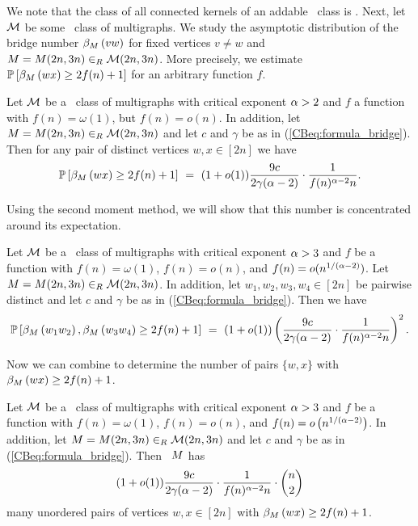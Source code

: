 We note that the class of all connected kernels of an addable \pl\ class is \bridgeStable. Next, let $\mathcal{M}$ be some \bridgeStable\ class of multigraphs. We study the asymptotic distribution of the bridge number $\beta_{M}\left(vw\right)$ for fixed vertices $v\neq w$ and $M=M(2n,3n) \in_R \mathcal{M}(2n,3n)$. More precisely, we estimate $\mathbb{P}\left[\beta_{M}\left(wx\right)\geq 2f(n)+1\right]$ for an arbitrary function $f$. 

\begin{lem}\label{CBlem:bridge_number1}
	Let $\mathcal{M}$ be a \bridgeStable\ class of multigraphs with critical exponent $\alpha>2$ and $f$ a function with $f(n)=\omega(1)$, but $f(n)=o(n)$. In addition, let $M=M(2n,3n)\in_R \mathcal{M}(2n,3n)$ and let $c$ and $\gamma$ be as in (\ref{CBeq:formula_bridge}). Then for any pair of distinct vertices $w, x \in [2n]$ we have 
	\[
	\mathbb{P}\left[\beta_{M}\left(wx\right)\geq 2f(n)+1\right]\ =\ (1+o(1))\frac{9c}{2\gamma (\alpha-2)}\cdot\frac{1}{f(n)^{\alpha-2}n}.
	\]
\end{lem}

Using the second moment method, we will show that this number is concentrated around its expectation. 

\begin{lem}\label{CBlem:bridge_number2}
Let $\mathcal{M}$ be a \bridgeStable\ class of multigraphs with critical exponent $\alpha>3$ and $f$ be a function with $f(n)=\omega(1)$, $f(n)=o(n)$, and $f(n)=o(n^{1/(\alpha-2)})$. Let $M=M(2n,3n)\in_R \mathcal{M}(2n,3n)$. In addition, let $w_1, w_2, w_3, w_4 \in [2n]$ be pairwise distinct and let $c$ and $\gamma$ be as in (\ref{CBeq:formula_bridge}). Then we have 
	\[
	\prob{\Bn{\bridgeGraph}{w_1w_2}, \Bn{\bridgeGraph}{w_3w_4}\geq 2f(n)+1}\ =\ (1+o(1))\left(\frac{9c}{2\gamma (\ce-2)}\cdot\frac{1}{f(n)^{\ce-2}n}\right)^2.
	\]
\end{lem}

Now we can combine  to determine the number of pairs $\{w,x\}$ with $\beta_{M}\left(wx\right)\geq 2f(n)+1$.
\begin{lem}\label{CBlem:bridge_number3}
	Let $\mathcal{M}$ be a \bridgeStable\ class of multigraphs with critical exponent $\alpha>3$ and $f$ be a function with $f(n)=\omega(1)$, $f(n)=o(n)$, and $f(n)=o\left(n^{1/(\alpha-2)}\right)$. In addition, let $M=M(2n,3n)\in_R \mathcal{M}(2n,3n)$ and let $c$ and $\gamma$ be as in (\ref{CBeq:formula_bridge}). Then \whp\ $M$ has
	\begin{align*}
	(1+o(1))\frac{9c}{2\gamma (\alpha-2)}\cdot \frac{1}{f(n)^{\alpha-2}n}\cdot \binom{n}{2}
	\end{align*}
	many unordered pairs of vertices $w, x\in [2n]$ with $\beta_{M}\left(wx\right)\geq 2f(n)+1$.
\end{lem}


